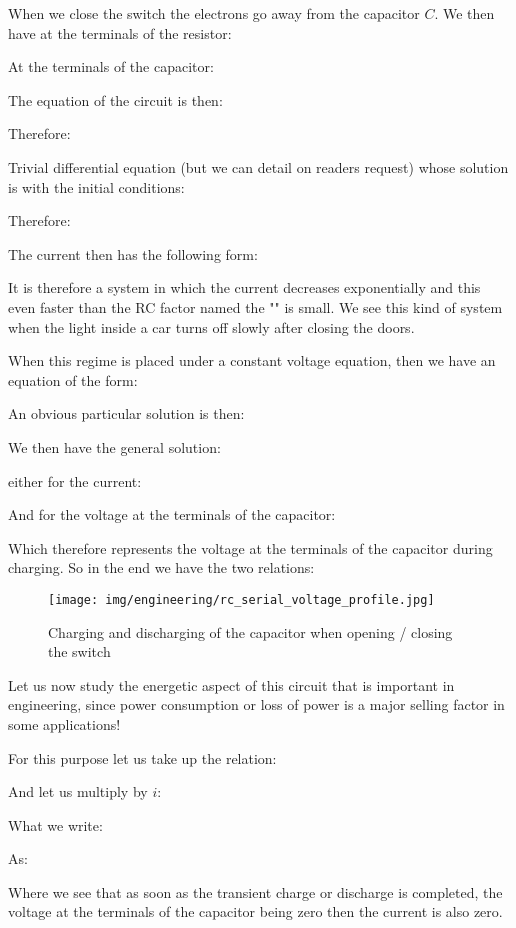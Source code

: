 	When we close the switch the electrons go away from the capacitor $C$. We then have at the terminals of the resistor:
	
	At the terminals of the capacitor:
	
	The equation of the circuit is then:
	
	Therefore:
	
	Trivial differential equation (but we can detail on readers request) whose solution is with the initial conditions:
	
	Therefore:
	
	The current then has the following form:
	
	It is therefore a system in which the current decreases exponentially and this even faster than the RC factor named the "" is small. We see this kind of system when the light inside a car turns off slowly after closing the doors.

	When this regime is placed under a constant voltage equation, then we have an equation of the form:
	
	An obvious particular solution is then:
	
	We then have the general solution:
	
	either for the current:
	
	And for the voltage at the terminals of the capacitor:
	
	Which therefore represents the voltage at the terminals of the capacitor during charging. So in the end we have the two relations:
	
	\begin{figure}[H]
		\centering
		\texttt{[image: img/engineering/rc\_serial\_voltage\_profile.jpg]}
		\caption[]{Charging and discharging of the capacitor when opening / closing the switch}
	\end{figure}
	Let us now study the energetic aspect of this circuit that is important in engineering, since power consumption or loss of power is a major selling factor in some applications!

	For this purpose let us take up the relation:
	
	And let us multiply by $i$:
	
	What we write:
	
	As:
	
	Where we see that as soon as the transient charge or discharge is completed, the voltage at the terminals of the capacitor being zero then the current is also zero.


